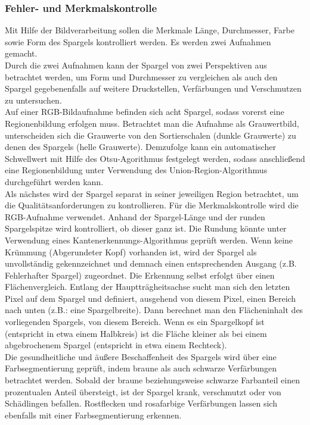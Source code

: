 \documentclass{ezb}
\begin{document}
\subsubsection*{Fehler- und Merkmalskontrolle}
Mit Hilfe der Bildverarbeitung sollen die Merkmale Länge, Durchmesser, Farbe sowie Form des Spargels kontrolliert werden. Es werden zwei Aufnahmen gemacht.\\
\linebreak
Durch die zwei Aufnahmen kann der Spargel von zwei Perspektiven aus betrachtet werden, um Form und Durchmesser zu vergleichen als auch den Spargel gegebenenfalls auf weitere Druckstellen, Verfärbungen und Verschmutzen zu untersuchen.\\
\linebreak
Auf einer RGB-Bildaufnahme befinden sich acht Spargel, sodass vorerst eine Regionenbildung erfolgen muss. Betrachtet man die Aufnahme als Grauwertbild, unterscheiden sich die Grauwerte von den Sortierschalen (dunkle Grauwerte) zu denen des Spargels (helle Grauwerte). Demzufolge kann ein automatischer Schwellwert mit Hilfe des Otsu-Agorithmus festgelegt werden, sodass anschließend eine Regionenbildung unter Verwendung des Union-Region-Algorithmus durchgeführt werden kann.\\
\linebreak 
Als nächstes wird der Spargel separat in seiner jeweiligen Region betrachtet, um die Qualitätsanforderungen zu kontrollieren. Für die Merkmalskontrolle wird die RGB-Aufnahme verwendet. Anhand der Spargel-Länge und der runden Spargelspitze wird kontrolliert, ob dieser ganz ist. Die Rundung könnte unter Verwendung eines Kantenerkennungs-Algorithmus geprüft werden. Wenn keine Krümmung (Abgerundeter Kopf) vorhanden ist, wird der Spargel als unvollständig gekennzeichnet und demnach einen entsprechenden Ausgang (z.B. \glqq Fehlerhafter Spargel\grqq) zugeordnet. Die Erkennung selbst erfolgt über einen Flächenvergleich. Entlang der Hauptträgheitsachse sucht man sich den letzten Pixel auf dem Spargel und definiert, ausgehend von diesem Pixel, einen Bereich nach unten (z.B.: eine Spargelbreite). Dann berechnet man den Flächeninhalt des vorliegenden Spargels, von diesem Bereich. Wenn es ein Spargelkopf ist (entspricht in etwa einem Halbkreis) ist die Fläche kleiner als bei einem abgebrochenem Spargel (entspricht in etwa einem Rechteck).\\
\linebreak
Die gesundheitliche und äußere Beschaffenheit des Spargels wird über eine Farbsegmentierung geprüft, indem braune als auch schwarze Verfärbungen betrachtet werden. Sobald der braune beziehungsweise schwarze Farbanteil einen prozentualen Anteil übersteigt, ist der Spargel krank, verschmutzt oder von Schädlingen befallen. Rostflecken und rosafarbige Verfärbungen lassen sich ebenfalls mit einer Farbsegmentierung erkennen.\\
\end{document}
